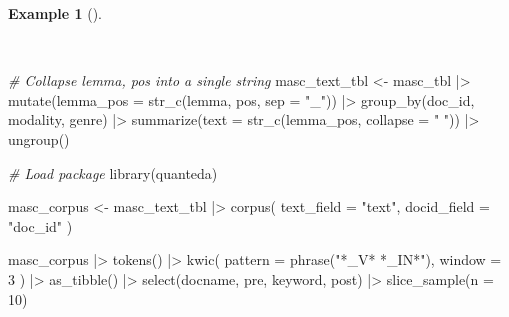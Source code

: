 \documentclass[
  letterpaper,
  DIV=11,
  numbers=noendperiod]{scrreport}
\newenvironment{Shaded}{\begin{snugshade}}{\end{snugshade}}
\newcommand{\AttributeTok}[1]{\textcolor[rgb]{0.00,0.00,0.00}{#1}}
\newcommand{\CommentTok}[1]{\textcolor[rgb]{0.00,0.00,0.00}{\textit{#1}}}
\newcommand{\DecValTok}[1]{\textcolor[rgb]{0.00,0.00,0.00}{#1}}
\newcommand{\FunctionTok}[1]{\textcolor[rgb]{0.00,0.00,0.00}{#1}}
\newcommand{\NormalTok}[1]{\textcolor[rgb]{0.00,0.00,0.00}{#1}}
\newcommand{\OtherTok}[1]{\textcolor[rgb]{0.00,0.00,0.00}{#1}}
\newcommand{\SpecialCharTok}[1]{\textcolor[rgb]{0.00,0.00,0.00}{#1}}
\newcommand{\StringTok}[1]{\textcolor[rgb]{0.00,0.00,0.00}{#1}}
\theoremstyle{definition}
\newtheorem{example}{Example}[chapter]
\theoremstyle{remark}
\begin{document}
\begin{example}[]\protect\hypertarget{exm-eda-masc-kwic}{}\label{exm-eda-masc-kwic}

~

\begin{Shaded}
\begin{Highlighting}[]
\CommentTok{\# Collapse lemma, pos into a single string}
\NormalTok{masc\_text\_tbl }\OtherTok{\textless{}{-}} 
\NormalTok{  masc\_tbl }\SpecialCharTok{|\textgreater{}} 
  \FunctionTok{mutate}\NormalTok{(}\AttributeTok{lemma\_pos =} \FunctionTok{str\_c}\NormalTok{(lemma, pos, }\AttributeTok{sep =} \StringTok{"\_"}\NormalTok{)) }\SpecialCharTok{|\textgreater{}}
  \FunctionTok{group\_by}\NormalTok{(doc\_id, modality, genre) }\SpecialCharTok{|\textgreater{}} 
  \FunctionTok{summarize}\NormalTok{(}\AttributeTok{text =} \FunctionTok{str\_c}\NormalTok{(lemma\_pos, }\AttributeTok{collapse =} \StringTok{" "}\NormalTok{)) }\SpecialCharTok{|\textgreater{}} 
  \FunctionTok{ungroup}\NormalTok{()}

\CommentTok{\# Load package}
\FunctionTok{library}\NormalTok{(quanteda)}

\NormalTok{masc\_corpus }\OtherTok{\textless{}{-}} 
\NormalTok{  masc\_text\_tbl }\SpecialCharTok{|\textgreater{}} 
  \FunctionTok{corpus}\NormalTok{(}
    \AttributeTok{text\_field =} \StringTok{"text"}\NormalTok{,}
    \AttributeTok{docid\_field =} \StringTok{"doc\_id"}
\NormalTok{  )}

\NormalTok{masc\_corpus }\SpecialCharTok{|\textgreater{}} 
  \FunctionTok{tokens}\NormalTok{() }\SpecialCharTok{|\textgreater{}} 
  \FunctionTok{kwic}\NormalTok{(}
    \AttributeTok{pattern =} \FunctionTok{phrase}\NormalTok{(}\StringTok{"*\_V* *\_IN*"}\NormalTok{),}
    \AttributeTok{window =} \DecValTok{3}
\NormalTok{  ) }\SpecialCharTok{|\textgreater{}} 
  \FunctionTok{as\_tibble}\NormalTok{() }\SpecialCharTok{|\textgreater{}} 
  \FunctionTok{select}\NormalTok{(docname, pre, keyword, post) }\SpecialCharTok{|\textgreater{}}
  \FunctionTok{slice\_sample}\NormalTok{(}\AttributeTok{n =} \DecValTok{10}\NormalTok{)}
\end{Highlighting}
\end{Shaded}


\end{example}
\end{document}

